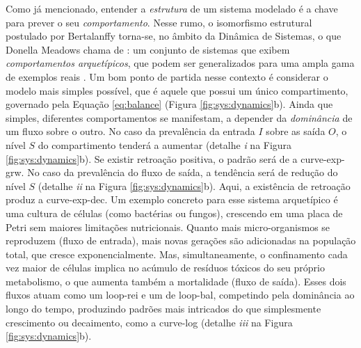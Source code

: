 \documentclass[./main.tex]{subfiles}
\begin{document}
\par  Como já mencionado, entender a \textit{estrutura} de um sistema modelado é a chave para prever o seu \textit{comportamento}. Nesse rumo, o isomorfismo estrutural postulado por Bertalanffy torna-se, no âmbito da Dinâmica de Sistemas, o que Donella Meadows chama de : um conjunto de sistemas que exibem \textit{comportamentos arquetípicos}, que podem ser generalizados para uma ampla gama de exemplos reais \cite{meadows2008}. Um bom ponto de partida nesse contexto é considerar o modelo mais simples possível, que é aquele que possui um único compartimento, governado pela Equação \eqref{eq:balance} (Figura \ref{fig:sys:dynamics}b). Ainda que simples, diferentes comportamentos se manifestam, a depender da \textit{dominância} de um fluxo sobre o outro. No caso da prevalência da entrada $I$ sobre as saída $O$, o nível $S$ do compartimento tenderá a aumentar (detalhe \textrm{\textit{i}} na Figura \ref{fig:sys:dynamics}b). Se existir retroação positiva, o padrão será de a \gls{curve-exp-grw}. No caso da prevalência do fluxo de saída, a tendência será de redução do nível $S$ (detalhe \textrm{\textit{ii}} na Figura \ref{fig:sys:dynamics}b). Aqui, a existência de retroação produz a \gls{curve-exp-dec}. Um exemplo concreto para esse sistema arquetípico é uma cultura de células (como bactérias ou fungos), crescendo em uma placa de Petri sem maiores limitações nutricionais. Quanto mais micro-organismos se reproduzem (fluxo de entrada), mais novas gerações são adicionadas na população total, que cresce exponencialmente. Mas, simultaneamente, o confinamento cada vez maior de células implica no acúmulo de resíduos tóxicos do seu próprio metabolismo, o que aumenta também a mortalidade (fluxo de saída). Esses dois fluxos atuam como um \gls{loop-rei} e um de \gls{loop-bal}, competindo pela dominância ao longo do tempo, produzindo padrões mais intricados do que simplesmente crescimento ou decaimento, como a \gls{curve-log} (detalhe \textrm{\textit{iii}} na Figura \ref{fig:sys:dynamics}b). 
\end{document}
